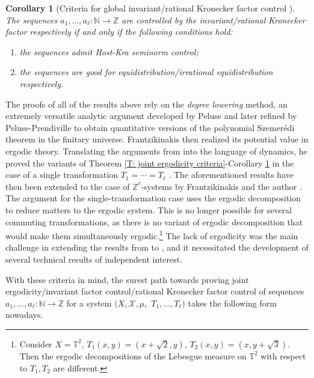 \documentclass[11pt]{amsart}
\newtheorem{corollary}[lemma]{Corollary}
\theoremstyle{definition}
\newcommand{\N}{{\mathbb N}}
\newcommand{\T}{{\mathbb T}}
\newcommand{\Z}{{\mathbb Z}}
\newcommand{\CB}{{\mathcal B}}
\newcommand{\CI}{{\mathcal I}}
\newcommand{\CX}{{\mathcal X}}
\newcommand{\1}{{\mathbf{1}}}
\begin{document}
\begin{corollary}[Criteria for global invariant/rational Kronecker factor control {\cite[Theorem 2.2]{FrKu22a}}]\label{C: invariant/Krat control criteria global}
    The sequences $a_1,\ldots,a_\ell\colon \N\to \Z$ are controlled by the invariant/rational Kronecker factor respectively if and only if the following conditions hold:
        \begin{enumerate}
            \item the sequences admit Host-Kra seminorm control;
            \item the sequences are good for equidistribution/irrational equidistribution respectively.
        \end{enumerate}
\end{corollary}

The proofs of all of the results above rely on the \emph{degree lowering} method, an extremely versatile analytic argument developed by Peluse \cite{Pel19} and later refined by Peluse-Prendiville \cite{PP19} to obtain quantitative versions of the polynomial Szemer\'edi theorem in the finitary universe. Frantzikinakis then realized its potential value in ergodic theory. Translating the arguments from \cite{PP19} into the language of dynamics, he proved the variants of Theorem \ref{T: joint ergodicity criteria}-Corollary \ref{C: invariant/Krat control criteria global} in the case of a single transformation $T_1 = \cdots = T_\ell$ \cite{Fr21}. The aforementioned results have then been extended to the case of $\Z^\ell$-systems by Frantzikinakis and the author \cite{FrKu22a}. The argument for the single-transformation case uses the ergodic decomposition to reduce matters to the ergodic system. This is no longer possible for several commuting transformations, as there is no variant of ergodic decomposition that would make them simultaneously ergodic.\footnote{Consider $X = \T^2$, $T_1(x,y) = (x+\sqrt{2},y)$, $T_2(x,y) = (x, y+\sqrt{3})$. Then the ergodic decompositions of the Lebesgue measure on $\T^2$ with respect to $T_1, T_2$ are different.}
The lack of ergodicity was the main challenge in extending the results from \cite{Fr21} to \cite{FrKu22a}, and it necessitated the development of several technical results of independent interest. 

With these criteria in mind, the surest path towards proving joint ergodicity/invariant factor control/rational Kronecker factor control of sequences $a_1, \ldots, a_\ell:\N\to\Z$ for a system $(X, \CX, \mu,$\! $T_1, \ldots, T_\ell)$ takes the following form nowadays.
\end{document}
